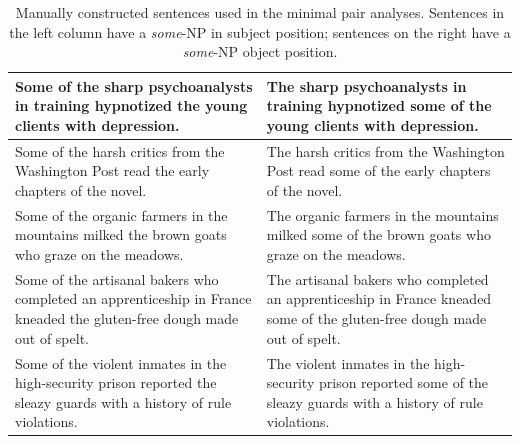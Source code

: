 \documentclass[11pt,a4paper]{article}
\begin{document}
\begin{table}[h]
\begin{tabular}{|p{}|p{}|}
        \hline
        Some of the sharp psychoanalysts in training hypnotized the young clients with depression. & The sharp psychoanalysts in training hypnotized some of the young clients with depression. \\
        \hline
        Some of the harsh critics from the Washington Post read the early chapters of the novel. & The harsh critics from the Washington Post read some of the early chapters of the novel. \\
        \hline
       Some of the organic farmers in the mountains milked the brown goats who graze on the meadows. & The organic farmers in the mountains milked some of the brown goats who graze on the meadows. \\
        \hline
        Some of the artisanal bakers who completed an apprenticeship in France kneaded the gluten-free dough made out of spelt. &  The artisanal bakers who completed an apprenticeship in France kneaded some of the gluten-free dough made out of spelt. \\ 
        \hline
        Some of the violent inmates in the high-security prison reported the sleazy guards with a history of rule violations. & The violent inmates in the high-security prison reported some of the sleazy guards with a history of rule violations. \\
       
        \hline
       
    \end{tabular}
    \caption{Manually constructed sentences used in the minimal pair analyses. Sentences in the left column have a \emph{some}-NP in subject position; sentences on the right have a \emph{some}-NP object position.}
    \label{tbl:artificial-sentences-1}
\end{table}
\end{document}
